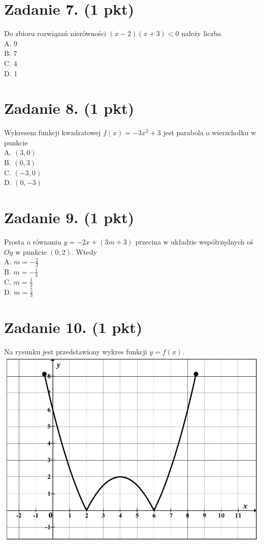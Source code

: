 \documentclass[10pt]{article}
\begin{document}
\section*{Zadanie 7. (1 pkt)}
Do zbioru rozwiązań nierówności \((x-2)(x+3)<0\) należy liczba\\
A. 9\\
B. 7\\
C. 4\\
D. 1

\section*{Zadanie 8. (1 pkt)}
Wykresem funkcji kwadratowej \(f(x)=-3 x^{2}+3\) jest parabola o wierzchołku w punkcie\\
A. \((3,0)\)\\
B. \((0,3)\)\\
C. \((-3,0)\)\\
D. \((0,-3)\)

\section*{Zadanie 9. (1 pkt)}
Prosta o równaniu \(y=-2 x+(3 m+3)\) przecina w układzie współrzędnych oś \(O y\) w punkcie \((0,2)\). Wtedy\\
A. \(m=-\frac{2}{3}\)\\
B. \(m=-\frac{1}{3}\)\\
C. \(m=\frac{1}{3}\)\\
D. \(m=\frac{5}{3}\)

\section*{Zadanie 10. (1 pkt)}
Na rysunku jest przedstawiony wykres funkcji \(y=f(x)\).\\
\includegraphics[max width=\textwidth, center]{2024_11_21_caf6b2e64dd65c9b24eeg-04}
\end{document}
